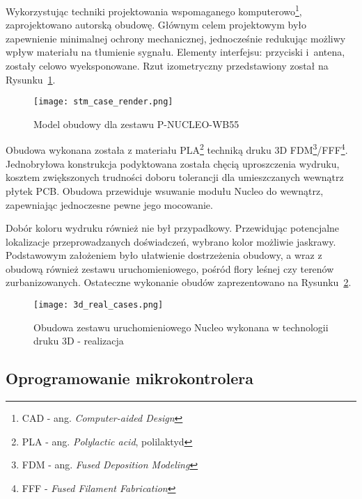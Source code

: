 Wykorzystując techniki projektowania wspomaganego komputerowo\footnote{\gls{CAD} - ang. \textit{Computer-aided Design}},
zaprojektowano autorską obudowę. Głównym celem projektowym było zapewnienie minimalnej ochrony
mechanicznej, jednocześnie redukując możliwy wpływ materiału na tłumienie sygnału. Elementy
interfejsu: przyciski i~antena, zostały celowo wyeksponowane. Rzut izometryczny przedstawiony został
na Rysunku~\ref{rys:obudowa_model3d}.


\begin{figure}[!htb]
	\centering \texttt{[image: stm\_case\_render.png]}
	\caption{Model obudowy dla zestawu P-NUCLEO-WB55}
	\label{rys:obudowa_model3d}
\end{figure}

Obudowa wykonana została z materiału \gls{PLA}\footnote{PLA - ang. \textit{Polylactic acid}, polilaktyd} techniką
druku 3D \gls{FDM}\footnote{FDM - ang. \textit{Fused Deposition Modeling}}/\gls{FFF}\footnote{FFF - \textit{Fused Filament Fabrication}}.
Jednobryłowa konstrukcja podyktowana została chęcią uproszczenia wydruku, kosztem zwiększonych trudności
doboru tolerancji dla umieszczanych wewnątrz płytek \gls{PCB}. Obudowa przewiduje wsuwanie modułu Nucleo
do wewnątrz, zapewniając jednoczesne pewne jego mocowanie.

Dobór koloru wydruku również nie był przypadkowy. Przewidując potencjalne lokalizacje przeprowadzanych
doświadczeń, wybrano kolor możliwie jaskrawy. Podstawowym założeniem było ułatwienie dostrzeżenia
obudowy, a wraz z obudową również zestawu uruchomieniowego, pośród flory leśnej czy terenów
zurbanizowanych. Ostateczne wykonanie obudów zaprezentowano na Rysunku~\ref{rys:obudowa_wykonanie}.

\begin{figure}[!htb]
	\centering \texttt{[image: 3d\_real\_cases.png]}
	\caption{Obudowa zestawu uruchomieniowego Nucleo wykonana w technologii druku 3D - realizacja}
	\label{rys:obudowa_wykonanie}
\end{figure}

\subsection{Oprogramowanie mikrokontrolera} \label{prep:uc-software}

